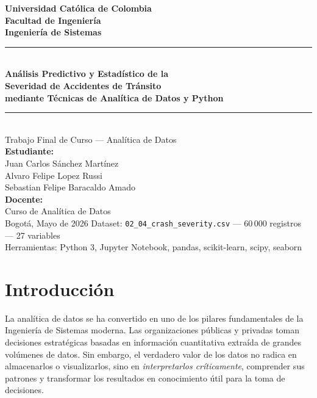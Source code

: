 \documentclass[11pt,a4paper]{article}
\begin{document}

\begin{titlepage}
\centering
{\LARGE\bfseries Universidad Católica de Colombia\\[0.4em]
Facultad de Ingeniería\\[0.4em]
Ingeniería de Sistemas\\[2em]}
\rule{\linewidth}{0.5pt}\\[1.5em]
{\huge\bfseries Análisis Predictivo y Estadístico de la\\[0.3em]
Severidad de Accidentes de Tránsito\\[0.3em]
mediante Técnicas de Analítica de Datos y Python\\[1.5em]}
\rule{\linewidth}{0.5pt}\\[1.5em]
{\Large Trabajo Final de Curso --- Analítica de Datos\\[2em]}
{\large\bfseries Estudiante:}\\[0.4em]
{\large Juan Carlos Sánchez Martínez\\[2em]}
{\large Alvaro Felipe Lopez Russi\\[2em]}
{\large Sebastian Felipe Baracaldo Amado\\[2em]}
{\large\bfseries Docente:}\\[0.4em]
{\large Curso de Analítica de Datos\\[2em]}
{\large Bogotá, Mayo de 2026}
\vfill
{\normalsize
Dataset: \texttt{02\_04\_crash\_severity.csv} --- 60\,000 registros --- 27 variables\\
Herramientas: Python 3, Jupyter Notebook, pandas, scikit-learn, scipy, seaborn}
\end{titlepage}

\tableofcontents
\newpage

\section{Introducción}

La analítica de datos se ha convertido en uno de los pilares fundamentales de la Ingeniería
de Sistemas moderna. Las organizaciones públicas y privadas toman decisiones estratégicas
basadas en información cuantitativa extraída de grandes volúmenes de datos. Sin embargo, el
verdadero valor de los datos no radica en almacenarlos o visualizarlos, sino en
\textit{interpretarlos críticamente}, comprender sus patrones y transformar los resultados en
conocimiento útil para la toma de decisiones.
\end{document}
